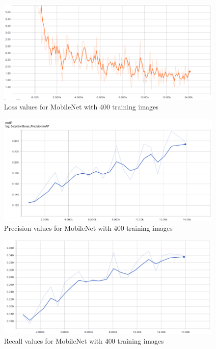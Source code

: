 \documentclass[12pt]{report}
\begin{document}
\vspace{0.5cm}
\begin{figure}[ht!]
	\centering
	\includegraphics[width=15cm]{loss-mobilenet-2}
	\caption{Loss values for MobileNet with 400 training images}
	\label{fig:loss-mobilenet-2}
\end{figure}

\vspace{0.5cm}
\begin{figure}[ht!]
	\centering
	\includegraphics[width=15cm]{precision-mobilenet-2}
	\caption{Precision values for MobileNet with 400 training images}
	\label{fig:precision-mobilenet-2}
\end{figure}

\vspace{0.5cm}
\begin{figure}[ht!]
	\centering
	\includegraphics[width=15cm]{recall-mobilenet-2}
	\caption{Recall values for MobileNet with 400 training images}
	\label{fig:recall-mobilenet-2}
\end{figure}
\end{document}
